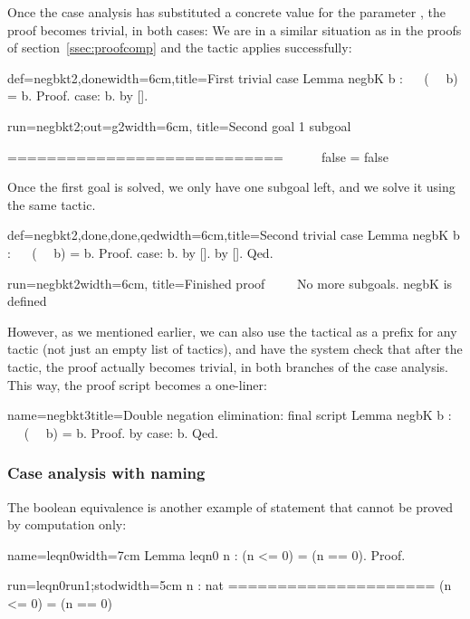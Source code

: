 Once the case analysis has substituted a concrete value for the
parameter , the proof becomes trivial, in both cases: We are in a
similar situation as in the proofs of section~\ref{ssec:proofcomp} and
the tactic  applies successfully:

\begin{coq-left}{def=negbkt2,done}{width=6cm,title=First trivial case}
Lemma negbK b : ~~ (~~ b) = b.
Proof.
case: b.
  by [].
\end{coq-left}
\begin{coqout-right}{run=negbkt2;out=g2}{width=6cm, title=Second goal}
1 subgoal

 ============================
   ~~ ~~ false = false
\end{coqout-right}

Once the first goal is solved, we only have one subgoal left, and
we solve it using the same tactic.

\begin{coq-left}{def=negbkt2,done,done,qed}{width=6cm,title=Second trivial case}
Lemma negbK b : ~~ (~~ b) = b.
Proof.
case: b.
  by [].
by [].
Qed.
\end{coq-left}
\begin{coqout-right}{run=negbkt2}{width=6cm, title=Finished proof}
$~$
$~$
$~$
$~$
No more subgoals.
negbK is defined
\end{coqout-right}

However, as we mentioned earlier, we can also use the  tactical as a
prefix for any tactic (not just an empty list of tactics),
and have the system check that after the
 tactic, the proof actually becomes trivial, in both branches
of the case analysis. This way, the proof script becomes a one-liner:

\begin{coq}{name=negbkt3}{title=Double negation elimination: final script}
Lemma negbK b : ~~ (~~ b) = b.
Proof. by case: b. Qed.
\end{coq}

\subsubsection{Case analysis with naming}

The boolean equivalence  is another example of statement that
cannot be proved by computation only:

\begin{coq-left}{name=leqn0}{width=7cm}
Lemma leqn0 n : (n <= 0) = (n == 0).
Proof.
\end{coq-left}
\begin{coqout-right}{run=leqn0run1;stod}{width=5cm}
n : nat
=====================
  (n <= 0) = (n == 0)
\end{coqout-right}


